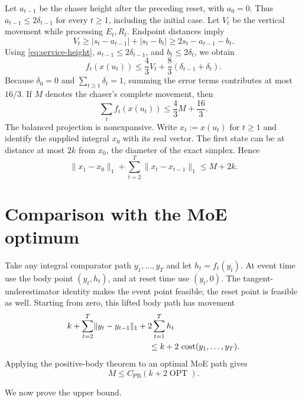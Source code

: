 \documentclass[11pt]{article}
\theoremstyle{remark}
\newcommand{\OPT}{\operatorname{OPT}}
\newcommand{\CPB}{C_{\mathrm{PB}}}
\begin{document}
Let $a_{t-1}$ be the chaser height after the preceding reset, with $a_0=0$.
Thus $a_{t-1}\leq2\delta_{t-1}$ for every $t\geq1$, including the initial
case.  Let $V_t$ be the vertical movement while processing $E_t,R_t$.
Endpoint distances imply
\[
 V_t\geq|s_t-a_{t-1}|+|s_t-b_t|
     \geq2s_t-a_{t-1}-b_t.
\]
Using \eqref{eq:service-height}, $a_{t-1}\leq2\delta_{t-1}$, and
$b_t\leq2\delta_t$, we obtain
\[
 f_t(x(u_t))
 \leq\frac43V_t+\frac83(\delta_{t-1}+\delta_t).
\]
Because $\delta_0=0$ and $\sum_{t\geq1}\delta_t=1$, summing the error terms
contributes at most $16/3$.  If $M$ denotes the chaser's complete movement,
then
\begin{equation}\label{eq:service-bridge}
 \sum_t f_t(x(u_t))\leq\frac43M+\frac{16}{3}.
\end{equation}
The balanced projection is nonexpansive.  Write $x_t:=x(u_t)$ for $t\geq1$
and identify the supplied integral $x_0$ with its real vector.  The first state
can be at distance at most $2k$ from $x_0$, the diameter of the exact simplex.
Hence
\begin{equation}\label{eq:movement-bridge}
 \lVert x_1-x_0\rVert_1+
   \sum_{t=2}^{T}\lVert x_t-x_{t-1}\rVert_1\leq M+2k.
\end{equation}

\section{Comparison with the MoE optimum}

Take any integral comparator path $y_1,\ldots,y_T$ and let
$h_t=f_t(y_t)$.  At event time use the body point $(y_t,h_t)$, and at reset
time use $(y_t,0)$.  The tangent-underestimator identity makes the event point
feasible; the reset point is feasible as well.  Starting from zero, this lifted
body path has movement
\begin{align}
 &k+\sum_{t=2}^{T}\lVert y_t-y_{t-1}\rVert_1+2\sum_{t=1}^{T}h_t
 \notag\\
 &\hspace{35mm}\leq k+2\,\operatorname{cost}(y_1,\ldots,y_T).
 \label{eq:comparator}
\end{align}
Applying the positive-body theorem to an optimal MoE path gives
\begin{equation}\label{eq:M}
 M\leq\CPB(k+2\OPT).
\end{equation}

We now prove the upper bound.
\end{document}
